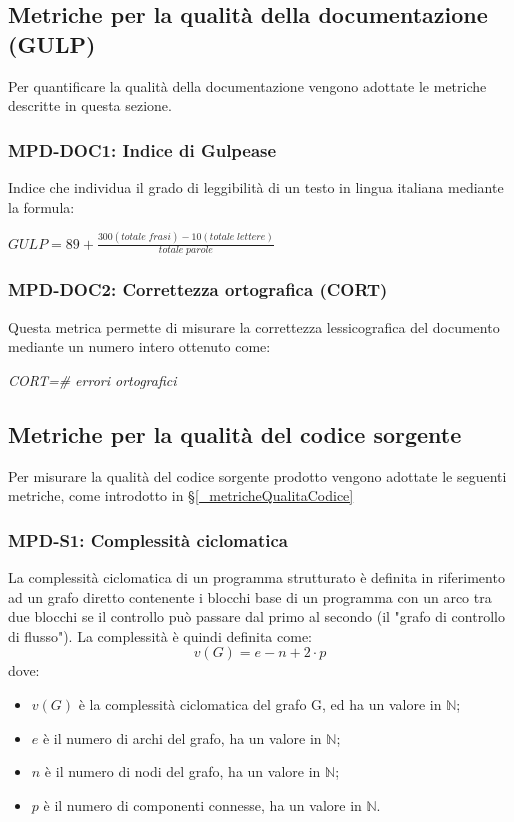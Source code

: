 \subsection{Metriche per la qualità della documentazione (GULP)} \label{_metricheprodotto}
Per quantificare la qualità della documentazione vengono adottate le metriche descritte in questa sezione.
\subsubsection{MPD-DOC1: Indice di Gulpease}
Indice che individua il grado di leggibilità di un testo in lingua italiana mediante la formula:
\begin{center}
    \(GULP=89+\frac{300(totale\; frasi)-10(totale\; lettere)}{totale\; parole}\)
\end{center}


\subsubsection{MPD-DOC2: Correttezza ortografica (CORT)}
Questa metrica permette di misurare la correttezza lessicografica del documento mediante un numero intero ottenuto come:
\begin{center}
    \textit{CORT=\# errori ortografici}
\end{center}


\subsection{Metriche per la qualità del codice sorgente} \label{_metricheCodiceSorgenteApp}
Per misurare la qualità del codice sorgente prodotto vengono adottate le seguenti metriche, come introdotto in \S\ref{_metricheQualitaCodice}

\subsubsection{MPD-S1: Complessità ciclomatica}
La complessità ciclomatica di un programma strutturato è definita in riferimento ad un grafo diretto
contenente i blocchi base di un programma con un arco tra due blocchi se il controllo può passare dal
primo al secondo (il "grafo di controllo di flusso"). La complessità è quindi definita come:
\[
    v(G) = e − n + 2 \cdot p  
\]
dove:
\begin{itemize}
    \item $v(G)$ è la complessità ciclomatica del grafo G, ed ha un valore in $\mathbb{N}$;
    \item $e$ è il numero di archi del grafo, ha un valore in $\mathbb{N}$;
    \item $n$ è il numero di nodi del grafo, ha un valore in $\mathbb{N}$;
    \item $p$ è il numero di componenti connesse, ha un valore in $\mathbb{N}$.
\end{itemize}

